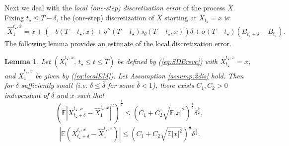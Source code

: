 \documentclass[letterpaper,10pt,reqno]{amsart}
\def\eqref#1{(\ref{#1})}
\newtheorem{lemma}[theorem]{Lemma}
\numberwithin{equation}{section}
\begin{document}
Next we deal with the {\em local (one-step) discretization error} of the process $\overline{X}$.
Fixing $t_{\star} \le T-\delta$, 
the (one-step) discretization of $\overline{X}$ starting at $\overline{X}_{t_\star} = x$
is:
\begin{equation}
\label{eq:localEM}
\begin{aligned}
\widehat{X}^{t_\star, x}_1 = x + (-b(T-t_\star, x) + 
\sigma^2(T-t_\star) s_\theta(T-t_\star, x)) \delta + \sigma(T - t_\star) (B_{t_\star + \delta} - B_{t_\star}). 
\end{aligned}
\end{equation}
The following lemma provides an estimate of the local discretization error.
\begin{lemma}
\label{lem:localest}
Let $(\overline{X}_t^{t_\star, x}, \, t_\star \le t \le T)$ be defined by \eqref{eq:SDErevc} with $\overline{X}^{t_\star, x}_{t_\star} = x$,
and $\widehat{X}^{t_\star, x}_1$ be given by \eqref{eq:localEM}.
Let Assumption \ref{assump:2dis} hold. 
Then for $\delta$ sufficiently small (i.e. $\delta \le \overline{\delta}$ for some $\overline{\delta} < 1$),
there exists $C_1, C_2 > 0$ independent of $\delta$ and $x$ such that
\begin{equation}
\label{eq:localest1}
\left(\mathbb{E}|\overline{X}^{t_\star, x}_{t_{\star} + \delta} -\widehat{X}^{t_\star, x}_1 |^2 \right)^{\frac{1}{2}}
\le (C_1 + C_2 \sqrt{\mathbb{E}|x|^2} )^{\frac{1}{2}} \delta^{\frac{3}{2}},
\end{equation}
\begin{equation}
\label{eq:localest2}
|\mathbb{E}(\overline{X}^{t_\star, x}_{t_{\star} + \delta} -\widehat{X}^{t_\star, x}_1)|
\le (C_1 + C_2 \sqrt{\mathbb{E}|x|^2} )^{\frac{1}{2}} \delta^{\frac{3}{2}}.
\end{equation}
\end{lemma}
\end{document}

